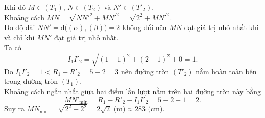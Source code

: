 \begin{ex}
{		Khi đó $M \in (T_1)$, $N \in (T_2)$ và $N' \in (T'_2)$.\\
		Khoảng cách $MN = \sqrt{NN'^2 + MN'^2} = \sqrt{2^2 + MN'^2}$.\\
		Do độ dài $NN' = \mathrm{d}\big((\alpha), (\beta)\big) = 2$ không đổi nên $MN$ đạt giá trị nhỏ nhất khi và chỉ khi $MN'$ đạt giá trị nhỏ nhất.\\
		Ta có
		\[I_1I'_2 = \sqrt{(1-1)^2 + (2-1)^2 + 0} = 1.\]
		Do $I_1I'_2 = 1 < R_1 - R'_2 = 5 - 2 = 3$ nên đường tròn $(T'_2)$ nằm hoàn toàn bên trong đường tròn $(T_1)$.\\
		Khoảng cách ngắn nhất giữa hai điểm lần lượt nằm trên hai đường tròn này bằng
		\[MN'_{\min} = R_1 - R'_2 - I_1I'_2 = 5 - 2 - 1 = 2.\]
		Suy ra $MN_{\min} = \sqrt{2^2 + 2^2} = 2\sqrt{2} \text{ (m)} \approx 283 \text{ (cm)}$.
	}
\end{ex}


